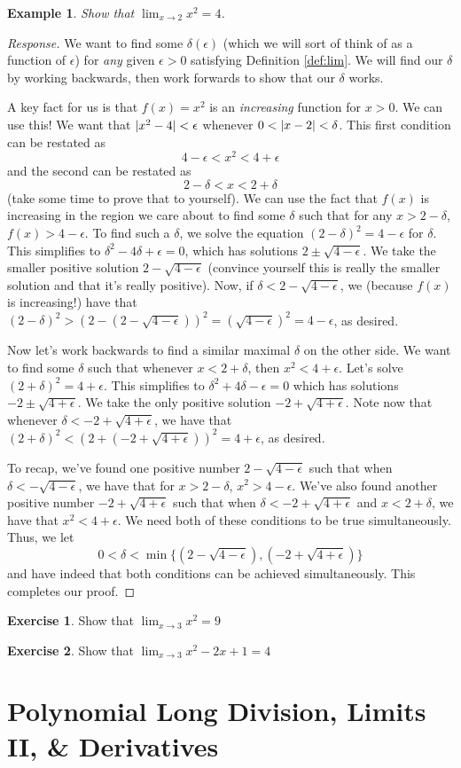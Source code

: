 \documentclass[english]{book}
\DeclarePairedDelimiter\abs{\lvert}{\rvert}%
\newtheorem{example}[theorem]{Example}
\theoremstyle{remark}
\theoremstyle{definition}
\newtheorem{excs}{Exercise}
\newtheorem*{next week}{Next Week}
\newcommand{\dlim}{\displaystyle\lim}
\begin{document}
\begin{example}
	Show that $\dlim_{x\to 2}x^2=4$. 
\end{example}
\begin{proof}[Response]
	We want to find some $\delta(\epsilon)$ (which we will sort of think of as a function of $\epsilon$) for \emph{any} given $\epsilon>0$ satisfying Definition \ref{def:lim}. We will find our $\delta$ by working backwards, then work forwards to show that our $\delta$ works.

A key fact for us is that $f(x)=x^2$ is an \emph{increasing} function for $x>0$. We can use this! We want that $\abs{x^2-4}<\epsilon$ whenever $0<\abs{x-2}<\delta$. This first condition can be restated as $$4-\epsilon< x^2<4+\epsilon$$ and the second can be restated as $$2-\delta <x<2+\delta$$ (take some time to prove that to yourself).
We can use the fact that $f(x)$ is increasing in the region we care about to find some $\delta$ such that for any $x>2-\delta$, $f(x)>4-\epsilon$. To find such a $\delta$, we solve the equation $(2-\delta)^2=4-\epsilon$ for $\delta$. This simplifies to $\delta^2-4\delta+\epsilon=0$, which has solutions $2\pm \sqrt{4-\epsilon}$. We take the smaller positive solution $2-\sqrt{4-\epsilon}$ (convince yourself this is really the smaller solution and that it's really positive). Now, if $\delta<2-\sqrt{4-\epsilon}$, we (because $f(x)$ is increasing!) have that $(2-\delta)^2>(2-(2-\sqrt{4-\epsilon}))^2=(\sqrt{4-\epsilon})^2=4-\epsilon$, as desired.

Now let's work backwards to find a similar maximal $\delta$ on the other side. We want to find some $\delta$ such that whenever $x<2+\delta$, then $x^2<4+\epsilon$. Let's solve $(2+\delta)^2=4+\epsilon$. This simplifies to $\delta^2+4\delta-\epsilon=0$ which has solutions $-2\pm \sqrt{4+\epsilon}$. We take the only positive solution $-2+\sqrt{4+\epsilon}$. Note now that whenever $\delta<-2+\sqrt{4+\epsilon}$, we have that $(2+\delta)^2<(2+(-2+\sqrt{4+\epsilon}))^2=4+\epsilon$, as desired.

To recap, we've found one positive number $2-\sqrt{4-\epsilon}$ such that when $\delta<-\sqrt{4-\epsilon}$, we have that for $x>2-\delta$, $x^2>4-\epsilon$. We've also found another positive number $-2+\sqrt{4+\epsilon}$ such that when $\delta<-2+\sqrt{4+\epsilon}$ and $x<2+\delta$, we have that $x^2<4+\epsilon$. We need both of these conditions to be true simultaneously. Thus, we let $$0<\delta< \min \{(2-\sqrt{4-\epsilon}),(-2+\sqrt{4+\epsilon})\}$$ and have indeed that both conditions can be achieved simultaneously. This completes our proof. 
\end{proof}
\begin{excs} Show that $\dlim_{x\to 3}x^2=9$

	\end{excs}
\begin{excs} Show that $\dlim_{x\to 3}x^2-2x+1=4$
	
\end{excs}
\chapter{Polynomial Long Division, Limits II, \& Derivatives}
\end{document}
